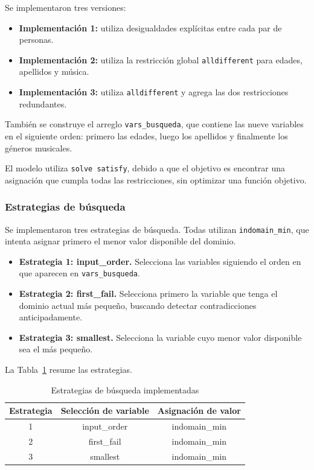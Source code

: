 Se implementaron tres versiones:

\begin{itemize}
    \item \textbf{Implementación 1:} utiliza desigualdades explícitas entre cada par de personas.
    \item \textbf{Implementación 2:} utiliza la restricción global \texttt{alldifferent} para edades, apellidos y música.
    \item \textbf{Implementación 3:} utiliza \texttt{alldifferent} y agrega las dos restricciones redundantes.
\end{itemize}

También se construye el arreglo \texttt{vars\_busqueda}, que contiene las nueve variables en el siguiente orden: primero las edades, luego los apellidos y finalmente los géneros musicales.

El modelo utiliza \texttt{solve satisfy}, debido a que el objetivo es encontrar una asignación que cumpla todas las restricciones, sin optimizar una función objetivo.

\subsubsection{Estrategias de búsqueda}

Se implementaron tres estrategias de búsqueda. Todas utilizan \texttt{indomain\_min}, que intenta asignar primero el menor valor disponible del dominio.

\begin{itemize}
    \item \textbf{Estrategia 1: input\_order.} Selecciona las variables siguiendo el orden en que aparecen en \texttt{vars\_busqueda}.

    \item \textbf{Estrategia 2: first\_fail.} Selecciona primero la variable que tenga el dominio actual más pequeño, buscando detectar contradicciones anticipadamente.

    \item \textbf{Estrategia 3: smallest.} Selecciona la variable cuyo menor valor disponible sea el más pequeño.
\end{itemize}

La Tabla~\ref{tab:acertijo-estrategias} resume las estrategias.

\begin{table}[htbp]
\caption{Estrategias de búsqueda implementadas}
\label{tab:acertijo-estrategias}
\begin{tabular}{@{}ccc@{}}
\toprule
\textbf{Estrategia} & \textbf{Selección de variable} & \textbf{Asignación de valor} \\
\midrule
1 & input\_order & indomain\_min \\
2 & first\_fail & indomain\_min \\
3 & smallest & indomain\_min \\
\bottomrule
\end{tabular}
\end{table}

